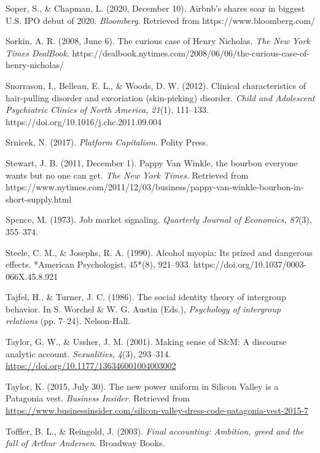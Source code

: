 \begin{thebibliography}{}
    Soper, S., \& Chapman, L. (2020, December 10). Airbnb’s shares soar in biggest U.S. IPO debut of 2020. \textit{Bloomberg}. Retrieved from https://www.bloomberg.com/

    Sorkin, A. R. (2008, June 6). The curious case of Henry Nicholas. \textit{The New York Times DealBook}. https://dealbook.nytimes.com/2008/06/06/the-curious-case-of-henry-nicholas/

    Snorrason, I., Belleau, E. L., \& Woods, D. W. (2012). Clinical characteristics of hair-pulling disorder and excoriation (skin-picking) disorder. \textit{Child and Adolescent Psychiatric Clinics of North America, 21}(1), 111–133. https://doi.org/10.1016/j.chc.2011.09.004

    Srnicek, N. (2017). \textit{Platform Capitalism}. Polity Press.

    Stewart, J. B. (2011, December 1). Pappy Van Winkle, the bourbon everyone wants but no one can get. \textit{The New York Times}. Retrieved from https://www.nytimes.com/2011/12/03/business/pappy-van-winkle-bourbon-in-short-supply.html

    Spence, M. (1973). Job market signaling. \textit{Quarterly Journal of Economics, 87}(3), 355–374.

    Steele, C. M., \& Josephs, R. A. (1990). Alcohol myopia: Its prized and dangerous effects. *American Psychologist, 45*(8), 921–933. https://doi.org/10.1037/0003-066X.45.8.921

    
    Tajfel, H., \& Turner, J. C. (1986). The social identity theory of intergroup behavior. In S. Worchel \& W. G. Austin (Eds.), \textit{Psychology of intergroup relations} (pp. 7–24). Nelson-Hall.

    Taylor, G. W., \& Ussher, J. M. (2001). Making sense of S\&M: A discourse analytic account. \textit{Sexualities, 4}(3), 293--314. \url{https://doi.org/10.1177/136346001004003002}

    Taylor, K. (2015, July 30). The new power uniform in Silicon Valley is a Patagonia vest. \textit{Business Insider}. Retrieved from \url{https://www.businessinsider.com/silicon-valley-dress-code-patagonia-vest-2015-7}

    Toffler, B. L., \& Reingold, J. (2003). \textit{Final accounting: Ambition, greed and the fall of Arthur Andersen}. Broadway Books.


\end{thebibliography}
